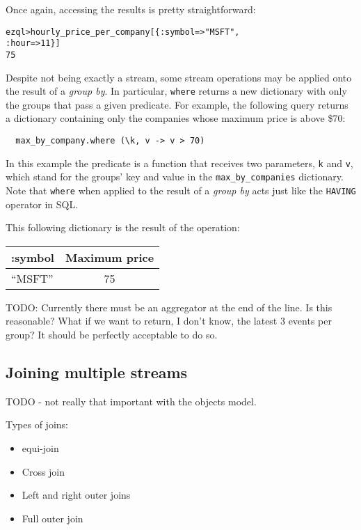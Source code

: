 \documentclass{report}
\newenvironment{evaluation}
{
  \framed
  \begin{alltt}
}
{
  \end{alltt}
  \endframed
}
\begin{document}
Once again, accessing the results is pretty straightforward:

\begin{evaluation}
  ezql> hourly_price_per_company[\{ :symbol => "MSFT",
                                    :hour   => 11 \}]
  75
\end{evaluation}

Despite not being exactly a stream, some stream operations may be
applied onto the result of a \emph{group by}. In particular,
\verb=where= returns a new dictionary with only the groups that pass a
given predicate. For example, the following query returns a dictionary
containing only the companies whose maximum price is above \$70:

\begin{verbatim}
  max_by_company.where (\k, v -> v > 70)
\end{verbatim}

In this example the predicate is a function that receives two
parameters, \verb=k= and \verb=v=, which stand for the groups' key and
value in the \verb=max_by_companies= dictionary. Note that
\verb=where= when applied to the result of a \emph{group by} acts just
like the \verb=HAVING= operator in SQL.

This following dictionary is the result of the operation:

\begin{tabular}{ |l|c| }
  \hline
  :symbol & Maximum price \\
  \hline
  ``MSFT'' & 75 \\
  \hline
\end{tabular}



TODO: Currently there must be an aggregator at the end of the line. Is
this reasonable? What if we want to return, I don't know, the latest 3
events per group? It should be perfectly acceptable to do so.

\subsection{Joining multiple streams}
\label{sec:join}

TODO - not really that important with the objects model.

Types of joins:
\begin{itemize}
\item equi-join
\item Cross join
\item Left and right outer joins
\item Full outer join
\end{itemize}
\end{document}
